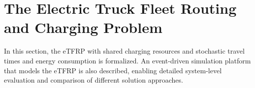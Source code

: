 \documentclass[a4paper,fleqn]{cas-sc}
\begin{document}





\section{The Electric Truck Fleet Routing and Charging Problem}\label{sec:problem}

In this section, the eTFRP with shared charging resources and stochastic travel times and energy consumption is formalized. An event-driven simulation platform that models the eTFRP is also described, enabling detailed system-level evaluation and comparison of different solution approaches.
\end{document}
